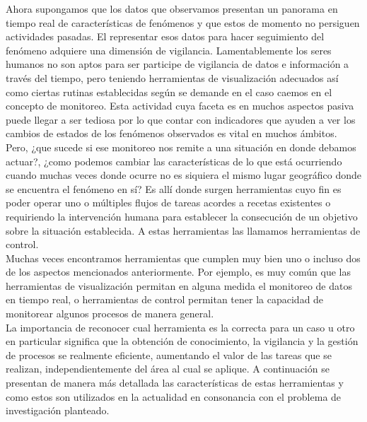 Ahora supongamos que los datos que observamos presentan un panorama en tiempo real de características de fenómenos y que estos de momento no persiguen actividades pasadas. El representar esos datos para hacer seguimiento del fenómeno adquiere una dimensión de vigilancia. Lamentablemente los seres humanos no son aptos para ser participe de vigilancia de datos e información a través del tiempo, pero teniendo herramientas de visualización adecuados así como ciertas rutinas establecidas según se demande en el caso caemos en el concepto de monitoreo. Esta actividad cuya faceta es en muchos aspectos pasiva puede llegar a ser tediosa por lo que contar con indicadores que ayuden a ver los cambios de estados de los fenómenos observados es vital en muchos ámbitos.\\

Pero, ¿que sucede si ese monitoreo nos remite a una situación en donde debamos actuar?, ¿como podemos cambiar las características de lo que está ocurriendo cuando muchas veces donde ocurre no es siquiera el mismo lugar geográfico donde se encuentra el fenómeno en sí? Es allí donde surgen herramientas cuyo fin es poder operar uno o múltiples flujos de tareas acordes a recetas existentes o requiriendo la intervención humana para establecer la consecución de un objetivo sobre la situación establecida. A estas herramientas las llamamos herramientas de control.\\

Muchas veces encontramos herramientas que cumplen muy bien uno o incluso dos de los aspectos mencionados anteriormente. Por ejemplo, es muy común que las herramientas de visualización permitan en alguna medida el monitoreo de datos en tiempo real, o herramientas de control permitan tener la capacidad de monitorear algunos procesos de manera general.\\

La importancia de reconocer cual herramienta es la correcta para un caso u otro en particular significa que la obtención de conocimiento, la vigilancia y la gestión de procesos se realmente eficiente, aumentando el valor de las tareas que se realizan, independientemente del área al cual se aplique. A continuación se presentan de manera más detallada las características de estas herramientas y como estos son utilizados en la actualidad en consonancia con el problema de investigación planteado.

